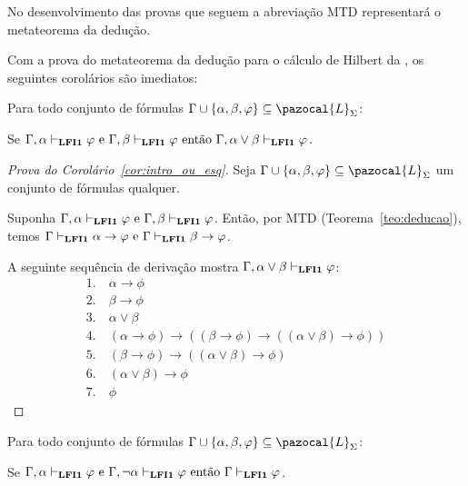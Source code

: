     No desenvolvimento das provas que seguem a abreviação MTD representará o metateorema da dedução.
    
    Com a prova do metateorema da dedução para o cálculo de Hilbert da \lfium{}, os seguintes corolários são imediatos:

    \begin{corolario}\label{cor:intro_ou_esq}
        Para todo conjunto de fórmulas $\Gamma \cup \{\alpha, \beta, \phi\} \subseteq \pazocal{L}_{\Sigma}$:

        \centering
        {\normalfont{}Se $\Gamma, \alpha \vdash_{{\normalfont\textbf{LFI1}}{}} \varphi \text{ e }\Gamma, \beta \vdash_{{\normalfont\textbf{LFI1}}{}} \varphi \text{ então } \Gamma, \alpha \lor \beta \vdash_{{\normalfont\textbf{LFI1}}{}} \varphi$.}
    \end{corolario}

    \begin{proof}[Prova do Corolário~\ref{cor:intro_ou_esq}]
        Seja $\Gamma \cup \{\alpha, \beta, \phi\} \subseteq \pazocal{L}_{\Sigma}$ um conjunto de fórmulas qualquer.
        
        Suponha $\Gamma, \alpha \vdash_{{\normalfont\textbf{LFI1}}{}} \varphi \text{ e }\Gamma, \beta \vdash_{{\normalfont\textbf{LFI1}}{}} \varphi$. 
        Então, por MTD (Teorema~\ref{teo:deducao}), temos $\Gamma \vdash_{{\normalfont\textbf{LFI1}}{}} \alpha \to \varphi \text{ e }\Gamma \vdash_{{\normalfont\textbf{LFI1}}{}} \beta \to \varphi$.

        A seguinte sequência de derivação mostra $\Gamma, \alpha \lor \beta \vdash_{{\normalfont\textbf{LFI1}}{}} \varphi$:
        \begin{align*}
            1. ~& \alpha \to \phi \tag{MTD aplicado à suposição} \\
            2. ~& \beta \to \phi \tag{MTD aplicado à suposição} \\
            3. ~& \alpha \lor \beta \tag{Premissa} \\
            4. ~& (\alpha \to \phi) \to ((\beta \to \phi) \to ((\alpha \lor \beta) \to \phi)) \tag{Ax8} \\
            5. ~& (\beta \to \phi) \to ((\alpha \lor \beta) \to \phi) \tag{MP 1, 4}\\
            6. ~& (\alpha \lor \beta) \to \phi \tag{MP 2, 5} \\
            7. ~& \phi \tag{MP 3, 6}
        \end{align*}
    \end{proof}


    \begin{corolario}\label{cor:prova_por_casos}
        Para todo conjunto de fórmulas $\Gamma \cup \{\alpha, \beta, \phi\} \subseteq \pazocal{L}_{\Sigma}$:

        \centering
        {\normalfont{}Se $\Gamma, \alpha \vdash_{{\normalfont\textbf{LFI1}}{}} \varphi \text{ e }\Gamma, \neg\alpha \vdash_{{\normalfont\textbf{LFI1}}{}} \varphi \text{ então } \Gamma \vdash_{{\normalfont\textbf{LFI1}}{}} \varphi$.}
    \end{corolario}

